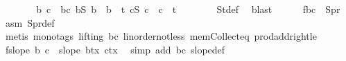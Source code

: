 \begin{isabellebody}
\ \ \ \ \isamarkupfalse%
\ \isamarkupfalse%
\ b{}\ c{}\ \ b{}c{}{\isacharcolon}{\kern0pt}\ {\isachardoublequoteopen}b{}{\isasymin}S{}{\isachardoublequoteclose}\ {\isachardoublequoteopen}b\ {\isacharequal}{\kern0pt}\ b{}\ {\isacharplus}{\kern0pt}\ t{\isachardoublequoteclose}\ {\isachardoublequoteopen}c{}{\isasymin}S{}{\isachardoublequoteclose}\ {\isachardoublequoteopen}c\ {\isacharequal}{\kern0pt}\ c{}\ {\isacharplus}{\kern0pt}\ t{\isachardoublequoteclose}\isanewline
\ \ \ \ \ \ \isamarkupfalse%
\ S{}t{\isacharunderscore}{\kern0pt}def\ \isamarkupfalse%
\ blast\isanewline
\ \ \ \ \isamarkupfalse%
\ f{}{\isacharcolon}{\kern0pt}{\isachardoublequoteopen}{\isacharparenleft}{\kern0pt}b{}{\isacharcomma}{\kern0pt}c{}{\isacharparenright}{\kern0pt}\ {\isasymin}\ S{}pr{\isachardoublequoteclose}\ \isamarkupfalse%
\ asm\ S{}pr{\isacharunderscore}{\kern0pt}def\ \isamarkupfalse%
\ {\isacharparenleft}{\kern0pt}metis\ {\isacharparenleft}{\kern0pt}mono{\isacharunderscore}{\kern0pt}tags{\isacharcomma}{\kern0pt}\ lifting{\isacharparenright}{\kern0pt}\ b{}c{}{\isacharparenleft}{\kern0pt}{}{\isacharcomma}{\kern0pt}{}{\isacharcomma}{\kern0pt}{}{\isacharcomma}{\kern0pt}{}{\isacharparenright}{\kern0pt}\ linorder{\isacharunderscore}{\kern0pt}not{\isacharunderscore}{\kern0pt}less\ mem{\isacharunderscore}{\kern0pt}Collect{\isacharunderscore}{\kern0pt}eq\ prod{\isacharunderscore}{\kern0pt}addright{\isacharunderscore}{\kern0pt}le{\isacharparenright}{\kern0pt}\isanewline
\ \ \ \ \isamarkupfalse%
\ f{}{\isacharcolon}{\kern0pt}{\isachardoublequoteopen}slope\ b\ c\ {\isacharequal}{\kern0pt}\ slope\ {\isacharparenleft}{\kern0pt}b{}{\isacharplus}{\kern0pt}{\isacharparenleft}{\kern0pt}tx{\isacharcomma}{\kern0pt}{}{\isacharparenright}{\kern0pt}{\isacharparenright}{\kern0pt}\ {\isacharparenleft}{\kern0pt}c{}{\isacharplus}{\kern0pt}{\isacharparenleft}{\kern0pt}tx{\isacharcomma}{\kern0pt}{}{\isacharparenright}{\kern0pt}{\isacharparenright}{\kern0pt}{\isachardoublequoteclose}\ \isamarkupfalse%
\ {\isacharparenleft}{\kern0pt}simp\ add{\isacharcolon}{\kern0pt}\ b{}c{}{\isacharparenleft}{\kern0pt}{}{\isacharcomma}{\kern0pt}{}{\isacharparenright}{\kern0pt}\ slope{\isacharunderscore}{\kern0pt}def{\isacharparenright}{\kern0pt}\isanewline

\end{isabellebody}

